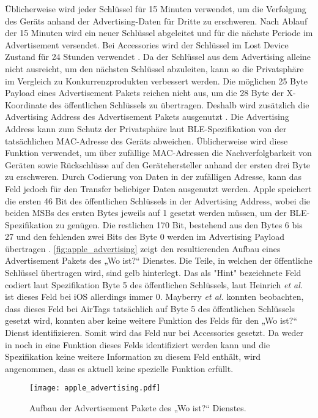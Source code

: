 Üblicherweise wird jeder Schlüssel für 15 Minuten verwendet, um die Verfolgung des Geräts anhand der Advertising-Daten für Dritte zu erschweren.
Nach Ablauf der 15 Minuten wird ein neuer Schlüssel abgeleitet und für die nächste Periode im Advertisement versendet.
Bei Accessories wird der Schlüssel im Lost Device Zustand für 24 Stunden verwendet \cite{Mayberry_Tracking}.
Da der Schlüssel aus dem Advertising alleine nicht ausreicht, um den nächsten Schlüssel abzuleiten, kann so die Privatsphäre im Vergleich zu Konkurrenzprodukten verbessert werden.
Die möglichen 25 Byte Payload eines Advertisement Pakets reichen nicht aus, um die 28 Byte der X-Koordinate des öffentlichen Schlüssels zu übertragen.
Deshalb  wird zusätzlich die Advertising Address des Advertisement Pakets ausgenutzt \cite{Heinrich_FindMy}.
Die Advertising Address kann zum Schutz der Privatsphäre laut \ac{BLE}-Spezifikation \cite{Spec_BLE_5.3} von der tatsächlichen \ac{MAC}-Adresse des Geräts abweichen.
Üblicherweise wird diese Funktion verwendet, um über zufällige \ac{MAC}-Adressen die Nachverfolgbarkeit von Geräten sowie Rückschlüsse auf den Gerätehersteller anhand der ersten drei Byte zu erschweren.
Durch Codierung von Daten in der zufälligen Adresse, kann das Feld jedoch für den Transfer beliebiger Daten ausgenutzt werden.
Apple speichert die ersten 46 Bit des öffentlichen Schlüssels in der Advertising Address, wobei die beiden \acp{MSB} des ersten Bytes jeweils auf 1 gesetzt werden müssen, um der \ac{BLE}-Spezifikation zu genügen.
Die restlichen 170 Bit, bestehend aus den Bytes 6 bis 27 und den fehlenden zwei Bits des Byte 0 werden im Advertising Payload übertragen \cite{Apple_FindMySpec,Heinrich_FindMy}.
\autoref{fig:apple_advertising} zeigt den resultierenden Aufbau eines Advertisement Pakets des „Wo ist?“ Dienstes.
Die Teile, in welchen der öffentliche Schlüssel übertragen wird, sind gelb hinterlegt.
Das als "Hint" bezeichnete Feld codiert laut Spezifikation \cite{Apple_FindMySpec} Byte 5 des öffentlichen Schlüssels, laut Heinrich \textit{et al.} \cite{Heinrich_FindMy} ist dieses Feld bei iOS allerdings immer 0.
Mayberry \textit{et al.} \cite{Mayberry_Tracking} konnten beobachten, dass dieses Feld bei AirTags tatsächlich auf Byte 5 des öffentlichen Schlüssels gesetzt wird, konnten aber keine weitere Funktion des Felds für den „Wo ist?“ Dienst identifizieren.
Somit wird das Feld nur bei Accessories gesetzt.
Da weder in \cite{Heinrich_FindMy} noch in \cite{Mayberry_Tracking} eine Funktion dieses Felds identifiziert werden kann und die Spezifikation \cite{Apple_FindMySpec} keine weitere Information zu diesem Feld enthält, wird angenommen, dass es aktuell keine spezielle Funktion erfüllt.
\begin{figure}
    \centering
    \texttt{[image: apple\_advertising.pdf]}
    \caption{Aufbau der Advertisement Pakete des „Wo ist?“ Dienstes.}
    \label{fig:apple_advertising}
\end{figure}

